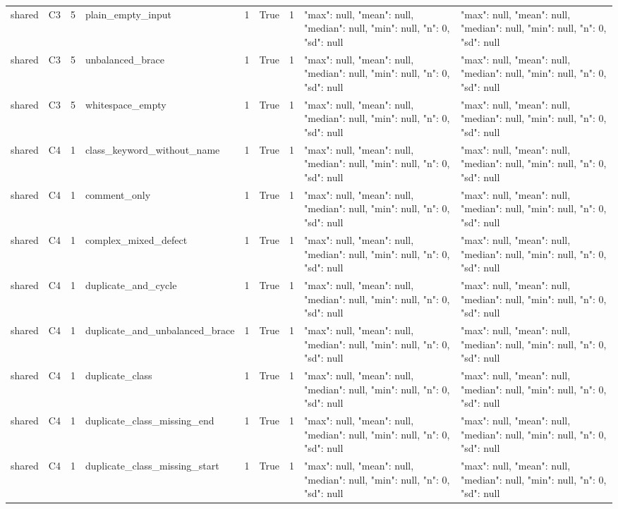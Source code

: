 \begin{tabular}{lllllllll}
shared & C3 & 5 & plain\_empty\_input & 1 & True & 1 & {"max": null, "mean": null, "median": null, "min": null, "n": 0, "sd": null} & {"max": null, "mean": null, "median": null, "min": null, "n": 0, "sd": null} \\
shared & C3 & 5 & unbalanced\_brace & 1 & True & 1 & {"max": null, "mean": null, "median": null, "min": null, "n": 0, "sd": null} & {"max": null, "mean": null, "median": null, "min": null, "n": 0, "sd": null} \\
shared & C3 & 5 & whitespace\_empty & 1 & True & 1 & {"max": null, "mean": null, "median": null, "min": null, "n": 0, "sd": null} & {"max": null, "mean": null, "median": null, "min": null, "n": 0, "sd": null} \\
shared & C4 & 1 & class\_keyword\_without\_name & 1 & True & 1 & {"max": null, "mean": null, "median": null, "min": null, "n": 0, "sd": null} & {"max": null, "mean": null, "median": null, "min": null, "n": 0, "sd": null} \\
shared & C4 & 1 & comment\_only & 1 & True & 1 & {"max": null, "mean": null, "median": null, "min": null, "n": 0, "sd": null} & {"max": null, "mean": null, "median": null, "min": null, "n": 0, "sd": null} \\
shared & C4 & 1 & complex\_mixed\_defect & 1 & True & 1 & {"max": null, "mean": null, "median": null, "min": null, "n": 0, "sd": null} & {"max": null, "mean": null, "median": null, "min": null, "n": 0, "sd": null} \\
shared & C4 & 1 & duplicate\_and\_cycle & 1 & True & 1 & {"max": null, "mean": null, "median": null, "min": null, "n": 0, "sd": null} & {"max": null, "mean": null, "median": null, "min": null, "n": 0, "sd": null} \\
shared & C4 & 1 & duplicate\_and\_unbalanced\_brace & 1 & True & 1 & {"max": null, "mean": null, "median": null, "min": null, "n": 0, "sd": null} & {"max": null, "mean": null, "median": null, "min": null, "n": 0, "sd": null} \\
shared & C4 & 1 & duplicate\_class & 1 & True & 1 & {"max": null, "mean": null, "median": null, "min": null, "n": 0, "sd": null} & {"max": null, "mean": null, "median": null, "min": null, "n": 0, "sd": null} \\
shared & C4 & 1 & duplicate\_class\_missing\_end & 1 & True & 1 & {"max": null, "mean": null, "median": null, "min": null, "n": 0, "sd": null} & {"max": null, "mean": null, "median": null, "min": null, "n": 0, "sd": null} \\
shared & C4 & 1 & duplicate\_class\_missing\_start & 1 & True & 1 & {"max": null, "mean": null, "median": null, "min": null, "n": 0, "sd": null} & {"max": null, "mean": null, "median": null, "min": null, "n": 0, "sd": null} \\

\end{tabular}
